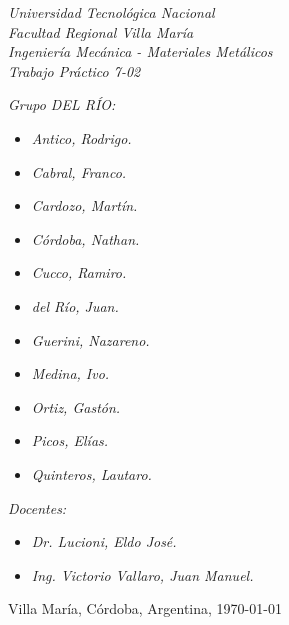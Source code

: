 \begin{titlepage}
	
	\begin{center}
		{\huge \textit{Universidad Tecnológica Nacional}}\\
        \vspace{0.5cm}
		{\LARGE \textit{Facultad Regional Villa María}}\\
		\vspace{1.5cm}
        {\LARGE{\textit{Ingeniería Mecánica - Materiales Metálicos}}}\\
		\vspace{1.5cm}
        \LARGE{\textit{Trabajo Práctico 7-02}}
	\end{center}
	
	\vfill

    \textit{Grupo DEL RÍO:}
	\begin{itemize}
		\item \textit{Antico, Rodrigo.}
		\item \textit{Cabral, Franco.}
        \item \textit{Cardozo, Martín.}
        \item \textit{Córdoba, Nathan.}
        \item \textit{Cucco, Ramiro.}
        \item \textit{del Río, Juan.}
        \item \textit{Guerini, Nazareno.}
        \item \textit{Medina, Ivo.}
        \item \textit{Ortiz, Gastón.}
        \item \textit{Picos, Elías.}
        \item \textit{Quinteros, Lautaro.}
	\end{itemize}
    
	\textit{Docentes:}
	\begin{itemize}
		\item \textit{Dr. Lucioni, Eldo José.}
		\item \textit{Ing. Victorio Vallaro, Juan Manuel.}
	\end{itemize}
	\begin{center}
		Villa María, Córdoba, Argentina, \today
	\end{center}
	
\end{titlepage}
